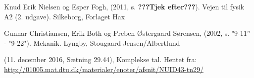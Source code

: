 \begin{thebibliography}{9}


 
  Knud Erik Nielsen og Esper Fogh,
  (2011, s. \textbf{???Tjek efter???}). 
  Vejen til fysik A2 (2. udgave). 
  Silkeborg,
  Forlaget Hax

  Gunnar Christiansen, Erik Both og Preben Østergaard Sørensen,
  (2002, s. "9-11'' - "9-22"). 
  Mekanik. 
  Lyngby,
  Stougaard Jensen/Albertlund
  
(11. december 2016, Sætning 29.44), Komplekse tal. Hentet fra:
\url{http://01005.mat.dtu.dk/materialer/enoter/afsnit/NUID43-tn29/}
  
  
\end{thebibliography}
